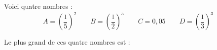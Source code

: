 
Voici quatre nombres :
\[A = \left(\frac{1}{5}\right)^2 \qquad B = \left(\frac{1}{2}\right)^5 \qquad C = 0{,}05 \qquad D = \left(\frac{1}{3}\right)^3\]

Le plus grand de ces quatre nombres est :

\smallskip


